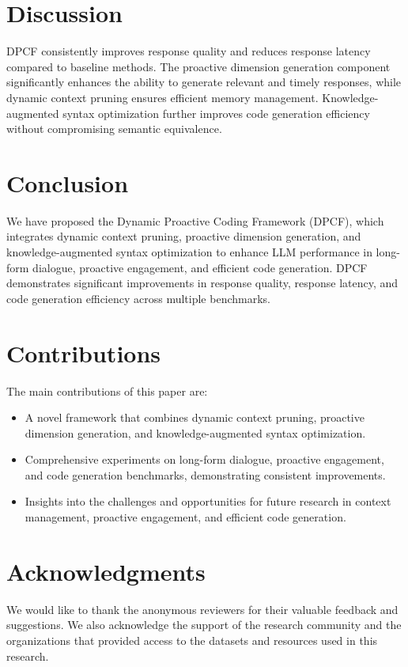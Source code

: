 \documentclass[11pt]{article}
\begin{document}
\section{Discussion}
\label{sec:discussion}
DPCF consistently improves response quality and reduces response latency compared to baseline methods. The proactive dimension generation component significantly enhances the ability to generate relevant and timely responses, while dynamic context pruning ensures efficient memory management. Knowledge-augmented syntax optimization further improves code generation efficiency without compromising semantic equivalence.

\section{Conclusion}
\label{sec:conclusion}
We have proposed the Dynamic Proactive Coding Framework (DPCF), which integrates dynamic context pruning, proactive dimension generation, and knowledge-augmented syntax optimization to enhance LLM performance in long-form dialogue, proactive engagement, and efficient code generation. DPCF demonstrates significant improvements in response quality, response latency, and code generation efficiency across multiple benchmarks.

\section{Contributions}
\label{sec:contributions}
The main contributions of this paper are:
\begin{itemize}
    \item A novel framework that combines dynamic context pruning, proactive dimension generation, and knowledge-augmented syntax optimization.
    \item Comprehensive experiments on long-form dialogue, proactive engagement, and code generation benchmarks, demonstrating consistent improvements.
    \item Insights into the challenges and opportunities for future research in context management, proactive engagement, and efficient code generation.
\end{itemize}

\section*{Acknowledgments}
We would like to thank the anonymous reviewers for their valuable feedback and suggestions. We also acknowledge the support of the research community and the organizations that provided access to the datasets and resources used in this research.



\end{document}
